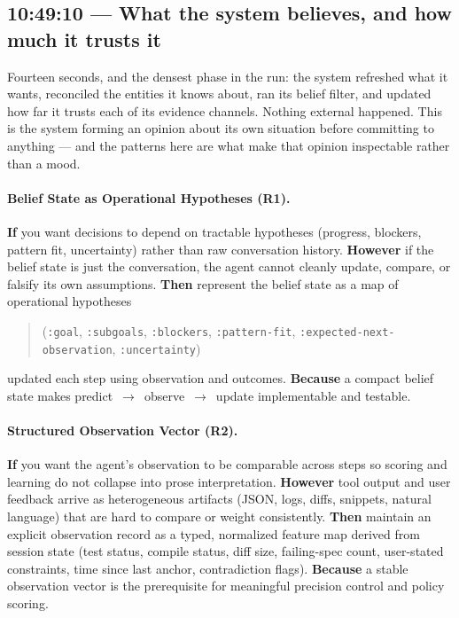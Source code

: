 \subsection*{10:49:10 --- What the system believes, and how much it trusts it}

Fourteen seconds, and the densest phase in the run: the system refreshed what it
wants, reconciled the entities it knows about, ran its belief filter, and
updated how far it trusts each of its evidence channels.  Nothing external
happened.  This is the system forming an opinion about its own situation before
committing to anything --- and the patterns here are what make that opinion
inspectable rather than a mood.

\hypertarget{pat-r1}{}\paragraph{Belief State as Operational Hypotheses (R1).}\label{pat:r1} \textbf{If} you want decisions to depend on tractable hypotheses (progress, blockers, pattern fit, uncertainty) rather than raw conversation history. \textbf{However} if the belief state is just the conversation, the agent cannot cleanly update, compare, or falsify its own assumptions. \textbf{Then} represent the belief state as a map of operational hypotheses
\begin{quote}
  (\texttt{:goal}, \texttt{:subgoals}, \texttt{:blockers}, \texttt{:pattern-fit}, \texttt{:expected-next-observation}, \texttt{:uncertainty})
\end{quote}
updated each step using observation and outcomes. \textbf{Because} a compact belief state makes predict~$\rightarrow$~observe~$\rightarrow$~update implementable and testable.

\paragraph{Structured Observation Vector (R2).} \textbf{If} you want the agent's observation to be comparable across steps so scoring and learning do not collapse into prose interpretation. \textbf{However} tool output and user feedback arrive as heterogeneous artifacts (JSON, logs, diffs, snippets, natural language) that are hard to compare or weight consistently. \textbf{Then} maintain an explicit observation record as a typed, normalized feature map derived from session state (test status, compile status, diff size, failing-spec count, user-stated constraints, time since last anchor, contradiction flags). \textbf{Because} a stable observation vector is the prerequisite for meaningful precision control and policy scoring.


